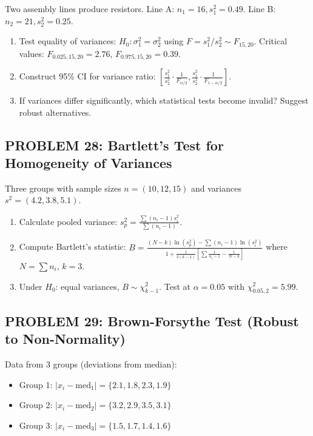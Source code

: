 \documentclass[12pt]{article}
\begin{document}
Two assembly lines produce resistors. Line A: \(n_1=16, s_1^2=0.49\). Line B: \(n_2=21, s_2^2=0.25\).

\begin{enumerate}
\item[(a)] Test equality of variances: \(H_0: \sigma_1^2 = \sigma_2^2\) using \(F = s_1^2/s_2^2 \sim F_{15,20}\). Critical values: \(F_{0.025,15,20} = 2.76\), \(F_{0.975,15,20} = 0.39\).
\item[(b)] Construct 95\% CI for variance ratio: \(\left[\frac{s_1^2}{s_2^2} \cdot \frac{1}{F_{\alpha/2}}, \frac{s_1^2}{s_2^2} \cdot \frac{1}{F_{1-\alpha/2}}\right]\).
\item[(c)] If variances differ significantly, which statistical tests become invalid? Suggest robust alternatives.
\end{enumerate}

\subsection*{PROBLEM 28: Bartlett's Test for Homogeneity of Variances}

Three groups with sample sizes \(n = (10, 12, 15)\) and variances \(s^2 = (4.2, 3.8, 5.1)\).

\begin{enumerate}
\item[(a)] Calculate pooled variance: \(s_p^2 = \frac{\sum(n_i-1)s_i^2}{\sum(n_i-1)}\).
\item[(b)] Compute Bartlett's statistic: \(B = \frac{(N-k)\ln(s_p^2) - \sum(n_i-1)\ln(s_i^2)}{1 + \frac{1}{3(k-1)}[\sum\frac{1}{n_i-1} - \frac{1}{N-k}]}\) where \(N = \sum n_i\), \(k=3\).
\item[(c)] Under \(H_0\): equal variances, \(B \sim \chi^2_{k-1}\). Test at \(\alpha=0.05\) with \(\chi^2_{0.05,2} = 5.99\).
\end{enumerate}

\subsection*{PROBLEM 29: Brown-Forsythe Test (Robust to Non-Normality)}

Data from 3 groups (deviations from median):
\begin{itemize}
\item Group 1: \(|x_i - \text{med}_1| = \{2.1, 1.8, 2.3, 1.9\}\)
\item Group 2: \(|x_i - \text{med}_2| = \{3.2, 2.9, 3.5, 3.1\}\)
\item Group 3: \(|x_i - \text{med}_3| = \{1.5, 1.7, 1.4, 1.6\}\)
\end{itemize}
\end{document}
